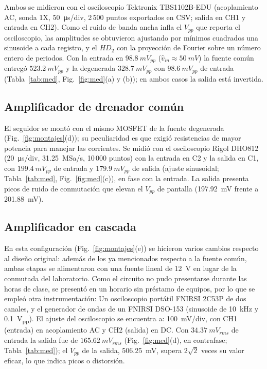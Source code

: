 \documentclass[conference]{IEEEtran}
\begin{document}
Ambos se midieron con el osciloscopio Tektronix TBS1102B-EDU (acoplamiento AC, sonda 1X, \SI{50}{\micro s}/div, 2\,500 puntos exportados en CSV; salida en CH1 y entrada en CH2). Como el ruido de banda ancha infla el $V_{pp}$ que reporta el osciloscopio, las amplitudes se obtuvieron ajustando por mínimos cuadrados una sinusoide a cada registro, y el $HD_2$ con la proyección de Fourier sobre un número entero de periodos. Con la entrada en $\SI{98.8}{mV_{pp}}$ ($\hat v_{in}\approx\SI{50}{mV}$) la fuente común entregó $\SI{523.2}{mV_{pp}}$ y la degenerada $\SI{328.7}{mV_{pp}}$ con $\SI{98.6}{mV_{pp}}$ de entrada (Tabla~\ref{tab:med}, Fig.~\ref{fig:med}(a) y (b)); en ambos casos la salida está invertida.

\subsection{Amplificador de drenador común}
\label{sec:mont_dc}
El seguidor se montó con el mismo MOSFET de la fuente degenerada (Fig.~\ref{fig:montajes}(d)); su peculiaridad es que exigió resistencias de mayor potencia para manejar las corrientes. Se midió con el osciloscopio Rigol DHO812 (\SI{20}{\micro s}/div, \SI{31.25}{MSa/s}, 10\,000 puntos) con la entrada en C2 y la salida en C1, con $\SI{199.4}{mV_{pp}}$ de entrada y $\SI{179.9}{mV_{pp}}$ de salida (ajuste sinusoidal; Tabla~\ref{tab:med}, Fig.~\ref{fig:med}(c)), en fase con la entrada. La salida presenta picos de ruido de conmutación que elevan el $V_{pp}$ de pantalla (\SI{197.92}{mV} frente a \SI{201.88}{mV}).

\subsection{Amplificador en cascada}
\label{sec:mont_casc}
En esta configuración (Fig.~\ref{fig:montajes}(e)) se hicieron varios cambios respecto al diseño original: además de los ya mencionados respecto a la fuente común, ambas etapas se alimentaron con una fuente lineal de \SI{12}{V} en lugar de la conmutada del laboratorio. Como el circuito no pudo presentarse durante las horas de clase, se presentó en un horario sin préstamo de equipos, por lo que se empleó otra instrumentación: Un osciloscopio portátil FNIRSI 2C53P de dos canales, y el generador de ondas de un FNIRSI DSO-153 (sinusoide de \SI{10}{kHz} y \SI{0.1}{V_{pp}}). El ajuste del osciloscopio se encuentra a:  \SI{100}{mV}/div, con CH1 (entrada) en acoplamiento AC y CH2 (salida) en DC. Con $\SI{34.37}{mV_{rms}}$ de entrada la salida fue de $\SI{165.62}{mV_{rms}}$ (Fig.~\ref{fig:med}(d), en contrafase; Tabla~\ref{tab:med}); el $V_{pp}$ de la salida, \SI{506.25}{mV}, supera $2\sqrt2$ veces su valor eficaz, lo que indica picos o distorsión.
\end{document}
